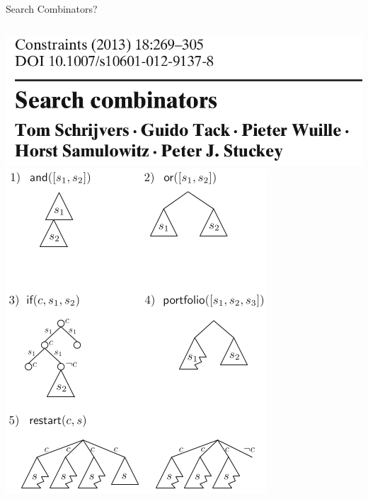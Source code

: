 \documentclass{beamer}
\begin{document}
\begin{frame}{Search Combinators?}
    \begin{columns}[T]
        \centering\includegraphics*[keepaspectratio=true,scale=0.12]{images/sc-title.png}
        \vspace{1em}
        \centering\includegraphics*[keepaspectratio=true,scale=0.27]{images/sc-primitives.png}


\end{columns}
\end{frame}
\end{document}
